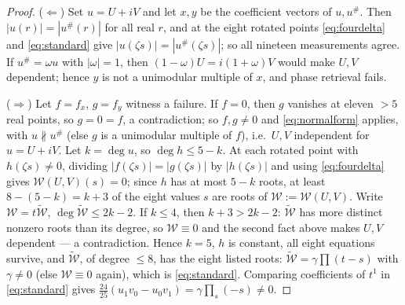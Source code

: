 \documentclass[10pt]{amsart}
\begin{document}
\begin{proof}
($\Leftarrow$) Set $u=U+iV$ and let $x,y$ be the coefficient vectors
of $u,u^{\#}$. Then $|u(r)|=|u^{\#}(r)|$ for all real $r$, and at the
eight rotated points \eqref{eq:fourdelta} and \eqref{eq:standard} give
$|u(\zeta s)|=|u^{\#}(\zeta s)|$; so all nineteen measurements agree.
If $u^{\#}=\omega u$ with $|\omega|=1$, then $(1-\omega)U=i(1+\omega)V$
would make $U,V$ dependent; hence $y$ is not a unimodular multiple of
$x$, and phase retrieval fails.

($\Rightarrow$) Let $f=f_x$, $g=f_y$ witness a failure. If $f=0$, then
$g$ vanishes at eleven $>5$ real points, so $g=0=f$, a contradiction;
so $f,g\neq0$ and \eqref{eq:normalform} applies, with
$u\not\parallel u^{\#}$ (else $g$ is a unimodular multiple of $f$),
i.e.\ $U,V$ independent for $u=U+iV$. Let $k=\deg u$, so $\deg
h\le5-k$. At each rotated point with $h(\zeta s)\neq0$, dividing
$|f(\zeta s)|=|g(\zeta s)|$ by $|h(\zeta s)|$ and using
\eqref{eq:fourdelta} gives $\mathcal W(U,V)(s)=0$; since $h$ has at
most $5-k$ roots, at least $8-(5-k)=k+3$ of the eight values $s$ are
roots of $\mathcal W:=\mathcal W(U,V)$. Write $\mathcal
W=t\widetilde{\mathcal W}$, $\deg\widetilde{\mathcal W}\le2k-2$. If
$k\le4$, then $k+3>2k-2$: $\widetilde{\mathcal W}$ has more distinct
nonzero roots than its degree, so $\mathcal W\equiv0$ and the second
fact above makes $U,V$ dependent --- a contradiction. Hence $k=5$, $h$
is constant, all eight equations survive, and $\widetilde{\mathcal
W}$, of degree $\le8$, has the eight listed roots:
$\widetilde{\mathcal W}=\gamma\prod(t-s)$ with $\gamma\neq0$ (else
$\mathcal W\equiv0$ again), which is \eqref{eq:standard}. Comparing
coefficients of $t^1$ in \eqref{eq:standard} gives
$\tfrac{24}{25}(u_1v_0-u_0v_1)=\gamma\prod_s(-s)\neq0$.
\end{proof}
\end{document}
